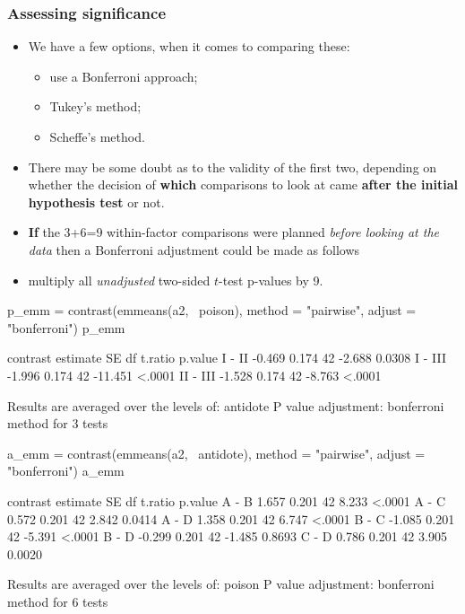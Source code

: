 \documentclass[a4paper]{article}
\begin{document}
\subsubsection{Assessing significance}
\begin{itemize}
	\item We have a few options, when it comes to comparing these:
	\begin{itemize}
		\item use a Bonferroni approach;
		\item Tukey's method;
		\item Scheffe's method.
	\end{itemize}
	\item There may be some doubt as to the validity of the first two, depending on whether the decision of \textbf{which} comparisons to look at came \textbf{after the initial hypothesis test} or not.
	\item \textbf{If} the 3+6=9 within-factor comparisons were planned \textit{before looking at the data} then a Bonferroni adjustment could be made as follows
	\item multiply all \textit{unadjusted} two-sided \( t \)-test p-values by 9.
\end{itemize}
\begin{Schunk}
\begin{Sinput}
p_emm = contrast(emmeans(a2, ~poison), method = "pairwise", adjust = "bonferroni")
p_emm
\end{Sinput}
\begin{Soutput}
 contrast estimate    SE df t.ratio p.value
 I - II     -0.469 0.174 42  -2.688  0.0308
 I - III    -1.996 0.174 42 -11.451  <.0001
 II - III   -1.528 0.174 42  -8.763  <.0001

Results are averaged over the levels of: antidote 
P value adjustment: bonferroni method for 3 tests 
\end{Soutput}
\begin{Sinput}
a_emm = contrast(emmeans(a2, ~antidote), method = "pairwise", adjust = "bonferroni")
a_emm
\end{Sinput}
\begin{Soutput}
 contrast estimate    SE df t.ratio p.value
 A - B       1.657 0.201 42   8.233  <.0001
 A - C       0.572 0.201 42   2.842  0.0414
 A - D       1.358 0.201 42   6.747  <.0001
 B - C      -1.085 0.201 42  -5.391  <.0001
 B - D      -0.299 0.201 42  -1.485  0.8693
 C - D       0.786 0.201 42   3.905  0.0020

Results are averaged over the levels of: poison 
P value adjustment: bonferroni method for 6 tests 
\end{Soutput}
\end{Schunk}
\end{document}
